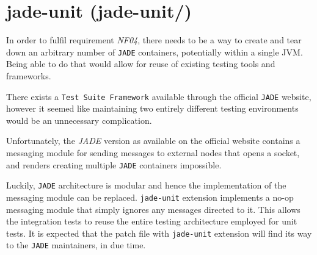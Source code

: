 \section{jade-unit (jade-unit/)}
In order to fulfil requirement \textit{NF04}, there needs to be a way to create and tear down an arbitrary number of \texttt{JADE} containers, potentially within a single JVM. Being able to do that would allow for reuse of existing testing tools and frameworks. 

There exists a \texttt{Test Suite Framework} available through the official \texttt{JADE} website, however it seemed like maintaining two entirely different testing environments would be an unnecessary complication.

Unfortunately, the \textit{JADE} version as available on the official website contains a messaging module for sending messages to external nodes that opens a socket, and renders creating multiple \texttt{JADE} containers impossible.

Luckily, \texttt{JADE} architecture is modular and hence the implementation of the messaging module can be replaced. \texttt{jade-unit} extension implements a no-op messaging module that simply ignores any messages directed to it. This allows the integration tests to reuse the entire testing architecture employed for unit tests. It is expected that the patch file with \texttt{jade-unit} extension will find its way to the \texttt{JADE} maintainers, in due time.
